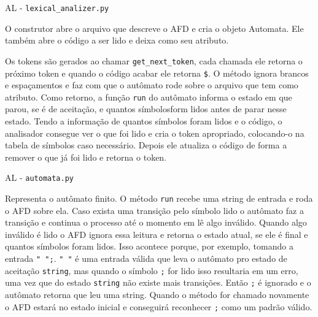\documentclass[10pt]{beamer}
\begin{document}
\begin{frame}{AL - \texttt{lexical\_analizer.py}}

    O construtor abre o arquivo que descreve o AFD e cria o objeto Automata.
    Ele também abre o código a ser lido e deixa como seu atributo.

    Os tokens são gerados ao chamar \texttt{get\_next\_token}, cada chamada ele
    retorna o próximo token e quando o código acabar ele retorna \texttt{\$}. O
    método ignora brancos e espaçamentos e faz com que o autômato rode sobre o
    arquivo que tem como atributo. Como retorno, a função \texttt{run} do
    autômato informa o estado em que parou, se é de aceitação, e quantos
    símbolosform lidos antes de parar nesse estado. Tendo a informação de
    quantos símbolos foram lidos e o código, o analisador consegue ver o que
    foi lido e cria o token apropriado, colocando-o na tabela de símbolos caso
    necessário. Depois ele atualiza o código de forma a remover o que já foi
    lido e retorna o token.

\end{frame}

\begin{frame}{AL - \texttt{automata.py}}

    Representa o autômato finito. O método \texttt{run} recebe uma string de
    entrada e roda o AFD sobre ela. Caso exista uma transição pelo símbolo lido
    o autômato faz a transição e continua o processo até o momento em lê algo
    inválido. Quando algo inválido é lido o AFD ignora essa leitura e retorna
    o estado atual, se ele é final e quantos símbolos foram lidos. Isso
    acontece porque, por exemplo, tomando a entrada \texttt{" ";}. \texttt{" "}
    é uma entrada válida que leva o autômato pro estado de aceitação
    \texttt{string}, mas quando o símbolo \texttt{;} for lido isso resultaria
    em um erro, uma vez que do estado \texttt{string} não existe mais
    transições. Então \texttt{;} é ignorado e o autômato retorna que leu uma
    string. Quando o método for chamado novamente o AFD estará no estado
    inicial e conseguirá reconhecer \texttt{;} como um padrão válido.

\end{frame}
\end{document}
